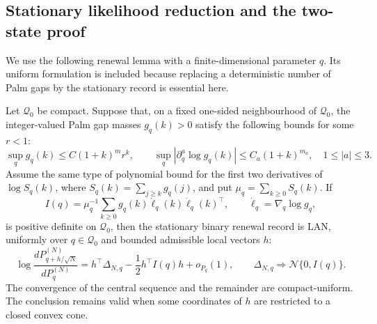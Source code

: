 \subsection{Stationary likelihood reduction and the two-state proof}
\label{subsec:stationary-renewal-lan-proof-main}

We use the following renewal lemma with a finite-dimensional parameter
\(q\).  Its uniform formulation is included because replacing a deterministic
number of Palm gaps by the stationary record is essential here.

\begin{lemma}
\label{lem:compact-uniform-stationary-renewal-lan-main}
Let \(\mathcal Q_0\) be compact.  Suppose that, on a fixed one-sided
neighbourhood of \(\mathcal Q_0\), the integer-valued Palm gap masses
\(g_q(k)>0\) satisfy the following bounds for some \(r<1\):
\[
 \sup_q g_q(k)\le C(1+k)^m r^k,
 \qquad
 \sup_q|\partial_q^a\log g_q(k)|\le C_a(1+k)^{m_a},
 \quad 1\le |a|\le3.
\tag{SL1}
\]
Assume the same type of polynomial bound for the first two derivatives of
\(\log S_q(k)\), where \(S_q(k)=\sum_{j\ge k}g_q(j)\), and put
\(\mu_q=\sum_{k\ge0}S_q(k)\).  If
\[
 I(q)=\mu_q^{-1}\sum_{k\ge0}g_q(k)
 \dot\ell_q(k)\dot\ell_q(k)^\top,
 \qquad \dot\ell_q=\nabla_q\log g_q,
\tag{SL2}
\]
is positive definite on \(\mathcal Q_0\), then the stationary binary renewal
record is LAN, uniformly over \(q\in\mathcal Q_0\) and bounded admissible
local vectors \(h\):
\[
 \log\frac{dP_{q+h/\sqrt N}^{(N)}}{dP_q^{(N)}}
 =h^\top\Delta_{N,q}-\frac12h^\top I(q)h+o_{P_q}(1),
 \qquad
 \Delta_{N,q}\Rightarrow\mathcal N\{0,I(q)\}.
\tag{SL3}
\]
The convergence of the central sequence and the remainder are compact-uniform.
The conclusion remains valid when some coordinates of \(h\) are restricted
to a closed convex cone.
\end{lemma}

